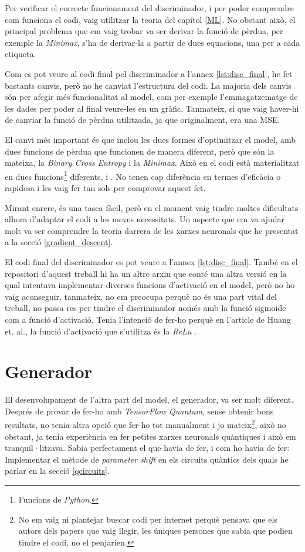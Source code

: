 Per verificar el correcte funcionament del discriminador, i per poder comprendre com funciona el codi, vaig utilitzar la teoria del capítol \ref{ML}. No obstant això, el principal problema que em vaig trobar va ser derivar la funció de pèrdua, per exemple la \textit{Minimax}, s'ha de derivar-la a partir de dues equacions, una per a cada etiqueta.

Com es pot veure al codi final pel discriminador a l'annex \ref{lst:disc_final}, he fet bastants canvis, però no he canviat l'estructura del codi. La majoria dels canvis són per afegir més funcionalitat al model, com per exemple l'emmagatzematge de les dades per poder al final veure-les en un gràfic. Tanmateix, si que vaig haver-hi de canviar la funció de pèrdua utilitzada, ja que originalment, era una MSE.

El canvi més important és que inclou les dues formes d'optimitzar el model, amb dues funcions de pèrdua que funcionen de manera diferent, però que són la mateixa, la \textit{Binary Cross Entropy} i la \textit{Minimax}. Això en el codi està materialitzat en dues funcions\footnote{Funcions de \textit{Python}.} diferents,  i . No tenen cap diferència en termes d'eficàcia o rapidesa i les vaig fer tan sols per comprovar aquest fet. 

Mirant enrere, és una tasca fàcil, però en el moment vaig tindre moltes dificultats alhora d'adaptar el codi a les meves necessitats. Un aspecte que em va ajudar molt va ser comprendre la teoria darrera de les xarxes neuronals que he presentat a la secció \ref{gradient_descent}.

El codi final del discriminador es pot veure a l'annex \ref{lst:disc_final}. També en el repositori d'aquest treball hi ha un altre arxiu que conté una altra versió en la qual intentava implementar diverses funcions d'activació en el model, però no ho vaig aconseguir, tanmateix, no em preocupa perquè no és una part vital del treball, no passa res per tindre el discriminador només amb la funció sigmoide com a funció d'activació. Tenia l'intenció de fer-ho perquè en l'article de Huang et. al., la funció d'activació que s'utilitza és la \textit{ReLu} \cite{QGAN_exp}. 

\section{Generador}

El desenvolupament de l'altra part del model, el generador, va ser molt diferent. Després de provar de fer-ho amb \textit{TensorFlow Quantum}, sense obtenir bons resultats, no tenia altra opció que fer-ho tot manualment i jo mateix\footnote{No em vaig ni plantejar buscar codi per internet perquè pensava que els autors dels papers que vaig llegir, les úniques persones que sabia que podien tindre el codi, no el penjarien.}, això no obstant, ja tenia experiència en fer petites xarxes neuronals quàntiques i això em tranquil·litzava. Sabia perfectament el que havia de fer, i com ho havia de fer: Implementar el mètode de \textit{parameter shift} en els circuits quàntics dels quals he parlar en la secció \ref{qcircuits}.

